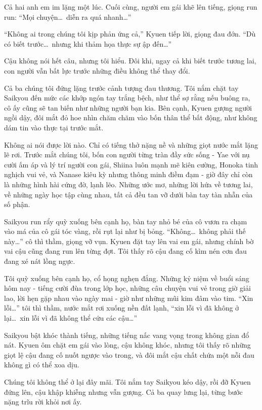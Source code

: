 \documentclass[../main.tex]{subfiles}
\begin{document}
Cả hai anh em im lặng một lúc. Cuối cùng, người em gái khẽ lên tiếng, giọng run run: ``Mọi chuyện\dots\ diễn ra quá nhanh\dots''

``Không ai trong chúng tôi kịp phản ứng cả,'' Kyuen tiếp lời, giọng đau đớn. ``Dù có biết trước\dots\ nhưng khi thảm họa thực sự ập đến\dots''

Cậu không nói hết câu, nhưng tôi hiểu. Đôi khi, ngay cả khi biết trước tương lai, con người vẫn bất lực trước những điều không thể thay đổi.

Cả ba chúng tôi đứng lặng trước cảnh tượng đau thương. Tôi nắm chặt tay Saikyou đến mức các khớp ngón tay trắng bệch, như thể sợ rằng nếu buông ra, cô ấy cũng sẽ tan biến như những người bạn kia. Bên cạnh, Kyuen gượng người ngồi dậy, đôi mắt đỏ hoe nhìn chăm chăm vào bốn thân thể bất động, như không dám tin vào thực tại trước mắt.

Không ai nói được lời nào. Chỉ có tiếng thở nặng nề và những giọt nước mắt lặng lẽ rơi. Trước mắt chúng tôi, bốn con người từng tràn đầy sức sống - Yae với nụ cười ấm áp và lý trí người con gái, Shiina luôn mạnh mẽ kiên cường, Honoka tinh nghịch vui vẻ, và Nanase kiêu kỳ nhưng thông minh điềm đạm - giờ đây chỉ còn là những hình hài cứng đờ, lạnh lẽo. Những ước mơ, những lời hứa về tương lai, về những ngày học tập cùng nhau, tất cả đều tan vỡ dưới bàn tay tàn nhẫn của số phận.

Saikyou run rẩy quỳ xuống bên cạnh họ, bàn tay nhỏ bé của cô vươn ra chạm vào má của cô gái tóc vàng, rồi rụt lại như bị bỏng. ``Không\dots\ không phải thế này\dots'' cô thì thầm, giọng vỡ vụn. Kyuen đặt tay lên vai em gái, nhưng chính bờ vai cậu cũng đang run lên từng đợt. Tôi thấy rõ cậu đang cố kìm nén cơn đau đang xé nát lồng ngực.

Tôi quỳ xuống bên cạnh họ, cổ họng nghẹn đắng. Những kỷ niệm về buổi sáng hôm nay - tiếng cười đùa trong lớp học, những câu chuyện vui vẻ trong giờ giải lao, lời hẹn gặp nhau vào ngày mai - giờ như những mũi kim đâm vào tim. ``Xin lỗi\dots'' tôi thì thầm, nước mắt rơi xuống nền đất lạnh, ``xin lỗi vì đã không ở lại\dots\ xin lỗi vì đã không thể cứu các cậu\dots''

Saikyou bật khóc thành tiếng, những tiếng nấc vang vọng trong không gian đổ nát. Kyuen ôm chặt em gái vào lòng, cậu không khóc, nhưng tôi thấy rõ những giọt lệ cậu đang cố nuốt ngược vào trong, và đôi mắt cậu chất chứa một nỗi đau không gì có thể xoa dịu.

Chúng tôi không thể ở lại đây mãi. Tôi nắm tay Saikyou kéo dậy, rồi đỡ Kyuen đứng lên, cậu khập khiễng nhưng vẫn gượng. Cả ba quay lưng lại, từng bước nặng trĩu rời khỏi nơi ấy.
\end{document}
